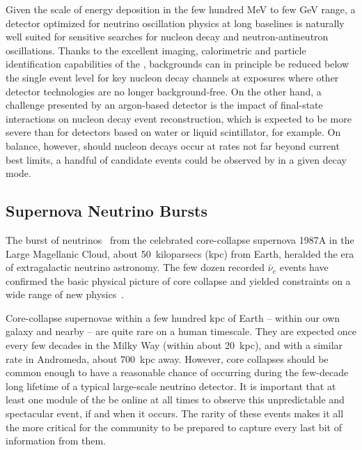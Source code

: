 Given the scale of energy deposition in the few hundred \si{\MeV} 
to few \si{\GeV} range, 
a detector optimized for neutrino oscillation physics at long 
baselines is naturally well suited for sensitive searches for 
nucleon decay and neutron-antineutron oscillations.
Thanks to the excellent imaging, calorimetric and particle 
identification capabilities of the , 
backgrounds can in principle be reduced below the single event 
level for key nucleon decay channels at exposures where other 
detector technologies are no longer background-free.  On the 
other hand, a challenge presented by an argon-based 
detector is the impact of final-state interactions on 
nucleon decay event reconstruction, which is 
expected to be more severe than for detectors based on water 
or liquid scintillator, for example.  
On balance, however, should nucleon decays occur at rates 
not far beyond current best limits, a handful of candidate 
events could be observed by  in a given decay mode.  

\subsection{Supernova Neutrino Bursts}

The burst of neutrinos~\cite{Bionta:1987qt,Hirata:1987hu} 
from the celebrated core-collapse supernova 
1987A in the Large Magellanic Cloud, about
\SI{50}{kiloparsecs} (kpc) from Earth, heralded the era of extragalactic neutrino
astronomy.  The few dozen recorded $\bar{\nu}_e$ events
have confirmed the basic physical
picture of core collapse and yielded constraints on a wide range of new
physics~\cite{Schramm:1990pf, Vissani:2014doa}.  

Core-collapse supernovae within a few hundred kpc of Earth --
within our own galaxy and nearby -- are quite rare on a human
timescale.  They are expected once every few decades in the Milky Way
(within about 20~kpc), and with a similar rate in Andromeda, about
700~kpc away.  However, core collapses should be common enough to have
a reasonable chance of occurring during the few-decade long lifetime
of a typical large-scale neutrino detector. %
It is important that at least one module of the  be online at all times to
observe this unpredictable and spectacular event, if and when it occurs.   
The rarity of these events makes it all the more critical for the community to
be prepared to capture every last bit of information from them.

